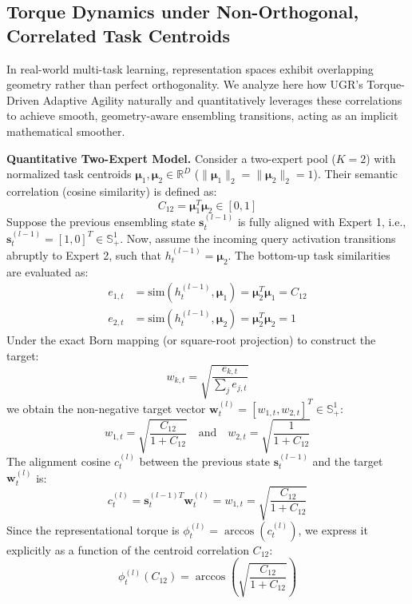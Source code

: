 \documentclass{article}
\theoremstyle{plain}
\theoremstyle{definition}
\theoremstyle{remark}
\begin{document}
\subsection{Torque Dynamics under Non-Orthogonal, Correlated Task Centroids}
\label{appendix:centroids}
In real-world multi-task learning, representation spaces exhibit overlapping geometry rather than perfect orthogonality. We analyze here how UGR's Torque-Driven Adaptive Agility naturally and quantitatively leverages these correlations to achieve smooth, geometry-aware ensembling transitions, acting as an implicit mathematical smoother.

\textbf{Quantitative Two-Expert Model.}
Consider a two-expert pool ($K=2$) with normalized task centroids $\boldsymbol{\mu}_1, \boldsymbol{\mu}_2 \in \mathbb{R}^D$ ($\|\boldsymbol{\mu}_1\|_2 = \|\boldsymbol{\mu}_2\|_2 = 1$). Their semantic correlation (cosine similarity) is defined as:
\begin{equation}
C_{12} = \boldsymbol{\mu}_1^T \boldsymbol{\mu}_2 \in [0, 1]
\end{equation}
Suppose the previous ensembling state $\mathbf{s}_t^{(l-1)}$ is fully aligned with Expert 1, i.e., $\mathbf{s}_t^{(l-1)} = [1, 0]^T \in \mathbb{S}^1_+$. Now, assume the incoming query activation transitions abruptly to Expert 2, such that $h_t^{(l-1)} = \boldsymbol{\mu}_2$. The bottom-up task similarities are evaluated as:
\begin{align}
e_{1, t} &= \text{sim}\left(h_t^{(l-1)}, \boldsymbol{\mu}_1\right) = \boldsymbol{\mu}_2^T \boldsymbol{\mu}_1 = C_{12} \\
e_{2, t} &= \text{sim}\left(h_t^{(l-1)}, \boldsymbol{\mu}_2\right) = \boldsymbol{\mu}_2^T \boldsymbol{\mu}_2 = 1
\end{align}
Under the exact Born mapping (or square-root projection) to construct the target:
\begin{equation}
w_{k, t} = \sqrt{\frac{e_{k, t}}{\sum_j e_{j, t}}}
\end{equation}
we obtain the non-negative target vector $\mathbf{w}_t^{(l)} = [w_{1, t}, w_{2, t}]^T \in \mathbb{S}^1_+$:
\begin{equation}
w_{1, t} = \sqrt{\frac{C_{12}}{1 + C_{12}}} \quad \text{and} \quad w_{2, t} = \sqrt{\frac{1}{1 + C_{12}}}
\end{equation}
The alignment cosine $c_t^{(l)}$ between the previous state $\mathbf{s}_t^{(l-1)}$ and the target $\mathbf{w}_t^{(l)}$ is:
\begin{equation}
c_t^{(l)} = \mathbf{s}_t^{(l-1) T} \mathbf{w}_t^{(l)} = w_{1, t} = \sqrt{\frac{C_{12}}{1 + C_{12}}}
\end{equation}
Since the representational torque is $\phi_t^{(l)} = \arccos\left(c_t^{(l)}\right)$, we express it explicitly as a function of the centroid correlation $C_{12}$:
\begin{equation}
\phi_t^{(l)}\left(C_{12}\right) = \arccos\left(\sqrt{\frac{C_{12}}{1 + C_{12}}}\right)
\end{equation}
\end{document}
